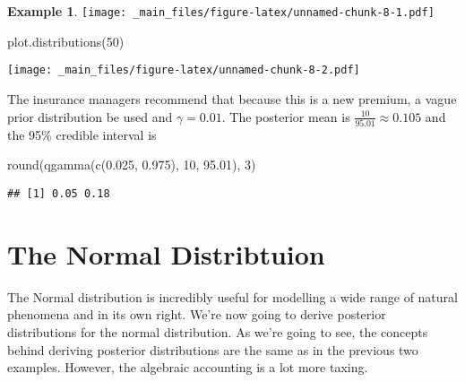\documentclass[
]{book}
\newenvironment{Shaded}{\begin{snugshade}}{\end{snugshade}}
\newcommand{\DecValTok}[1]{\textcolor[rgb]{0.00,0.00,0.81}{#1}}
\newcommand{\FloatTok}[1]{\textcolor[rgb]{0.00,0.00,0.81}{#1}}
\newcommand{\FunctionTok}[1]{\textcolor[rgb]{0.00,0.00,0.00}{#1}}
\newcommand{\NormalTok}[1]{#1}
\theoremstyle{definition}
\theoremstyle{definition}
\newtheorem{example}{Example}[chapter]
\theoremstyle{definition}
\theoremstyle{definition}
\theoremstyle{remark}
\begin{document}
\begin{example}
\texttt{[image: \_main\_files/figure-latex/unnamed-chunk-8-1.pdf]}

\begin{Shaded}
\begin{Highlighting}[]
\FunctionTok{plot.distributions}\NormalTok{(}\DecValTok{50}\NormalTok{)}
\end{Highlighting}
\end{Shaded}

\texttt{[image: \_main\_files/figure-latex/unnamed-chunk-8-2.pdf]}

The insurance managers recommend that because this is a new premium, a vague prior distribution be used and \(\gamma = 0.01\). The posterior mean is \(\frac{10}{95.01} \approx 0.105\) and the 95\% credible interval is

\begin{Shaded}
\begin{Highlighting}[]
\FunctionTok{round}\NormalTok{(}\FunctionTok{qgamma}\NormalTok{(}\FunctionTok{c}\NormalTok{(}\FloatTok{0.025}\NormalTok{, }\FloatTok{0.975}\NormalTok{), }\DecValTok{10}\NormalTok{, }\FloatTok{95.01}\NormalTok{), }\DecValTok{3}\NormalTok{)}
\end{Highlighting}
\end{Shaded}

\begin{verbatim}
## [1] 0.05 0.18
\end{verbatim}

\end{example}

\hypertarget{the-normal-distribtuion}{%
\section{The Normal Distribtuion}\label{the-normal-distribtuion}}

The Normal distribution is incredibly useful for modelling a wide range of natural phenomena and in its own right. We're now going to derive posterior distributions for the normal distribution. As we're going to see, the concepts behind deriving posterior distributions are the same as in the previous two examples. However, the algebraic accounting is a lot more taxing.
\end{document}
